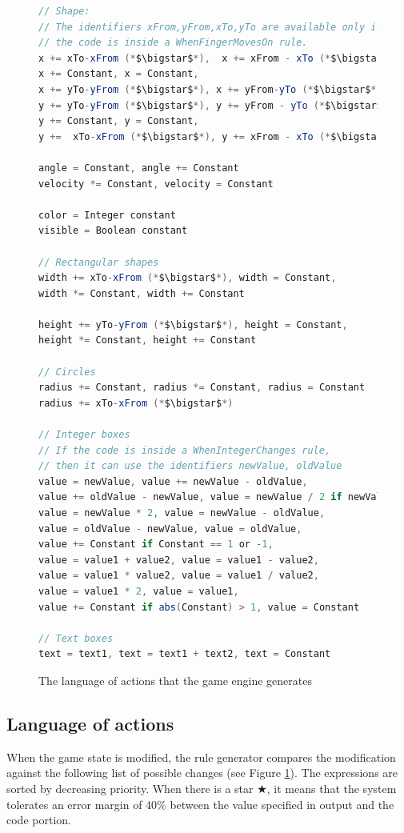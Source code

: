 \documentclass[12pt]{article} %
\begin{document}
\begin{figure}
\begin{lstlisting}[language=scala]
// Shape:
// The identifiers xFrom,yFrom,xTo,yTo are available only if
// the code is inside a WhenFingerMovesOn rule.
x += xTo-xFrom (*$\bigstar$*),  x += xFrom - xTo (*$\bigstar$*),
x += Constant, x = Constant,
x += yTo-yFrom (*$\bigstar$*), x += yFrom-yTo (*$\bigstar$*)
y += yTo-yFrom (*$\bigstar$*), y += yFrom - yTo (*$\bigstar$*),
y += Constant, y = Constant,
y +=  xTo-xFrom (*$\bigstar$*), y += xFrom - xTo (*$\bigstar$*)

angle = Constant, angle += Constant
velocity *= Constant, velocity = Constant

color = Integer constant
visible = Boolean constant

// Rectangular shapes
width += xTo-xFrom (*$\bigstar$*), width = Constant,
width *= Constant, width += Constant

height += yTo-yFrom (*$\bigstar$*), height = Constant,
height *= Constant, height += Constant

// Circles
radius += Constant, radius *= Constant, radius = Constant
radius += xTo-xFrom (*$\bigstar$*)

// Integer boxes
// If the code is inside a WhenIntegerChanges rule,
// then it can use the identifiers newValue, oldValue
value = newValue, value += newValue - oldValue,
value += oldValue - newValue, value = newValue / 2 if newValue % 2 == 0,
value = newValue * 2, value = newValue - oldValue,
value = oldValue - newValue, value = oldValue,
value += Constant if Constant == 1 or -1,
value = value1 + value2, value = value1 - value2,
value = value1 * value2, value = value1 / value2,
value = value1 * 2, value = value1,
value += Constant if abs(Constant) > 1, value = Constant

// Text boxes
text = text1, text = text1 + text2, text = Constant
\end{lstlisting}
\caption{The language of actions that the game engine generates
\label{actionlanguage}}
\end{figure}

\subsection{Language of actions}

When the game state is modified, the rule generator compares the modification
against the following list of possible changes (see Figure
\ref{actionlanguage}).
The expressions are sorted by decreasing priority. When there is a
star $\bigstar$, it means that the system tolerates an error margin of 40\%
between the value specified in output and the code portion.
\end{document}
